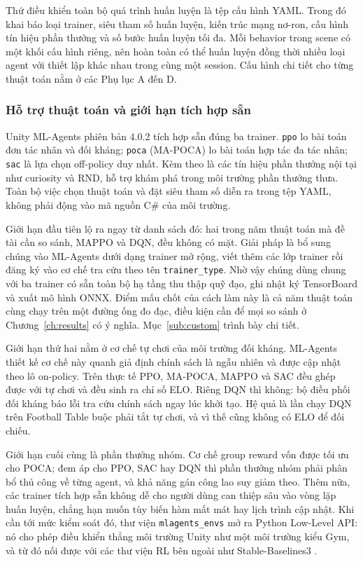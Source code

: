 \indent Thứ điều khiển toàn bộ quá trình huấn luyện là tệp cấu hình YAML. Trong đó khai
báo loại trainer, siêu tham số huấn luyện, kiến trúc mạng nơ-ron, cấu hình
tín hiệu phần thưởng và số bước huấn luyện tối đa. Mỗi behavior trong scene có một khối cấu hình riêng, nên hoàn toàn
có thể huấn luyện đồng thời nhiều loại agent với thiết lập khác nhau trong cùng một
session. Cấu hình chi tiết cho từng thuật toán nằm ở các Phụ lục A đến D.

\subsubsection{Hỗ trợ thuật toán và giới hạn tích hợp sẵn}
\label{sub:mllimits}
\indent Unity ML-Agents phiên bản 4.0.2 tích hợp sẵn đúng ba trainer. \texttt{ppo} lo bài
toán đơn tác nhân và đối kháng; \texttt{poca} (MA-POCA) lo bài toán hợp tác đa tác nhân;
\texttt{sac} là lựa chọn off-policy duy nhất. Kèm theo là các tín hiệu phần thưởng nội tại
như curiosity và RND, hỗ trợ khám phá trong môi trường phần thưởng thưa. Toàn bộ việc chọn
thuật toán và đặt siêu tham số diễn ra trong tệp YAML, không phải động vào mã nguồn C\#
của môi trường.

\indent Giới hạn đầu tiên lộ ra ngay từ danh sách đó: hai trong năm thuật toán mà đề tài
cần so sánh, MAPPO và DQN, đều không có mặt. Giải pháp là bổ sung chúng vào ML-Agents dưới
dạng trainer mở rộng, viết thêm các lớp trainer rồi đăng ký vào cơ chế tra cứu theo tên
\texttt{trainer\_type}. Nhờ vậy chúng dùng chung với ba trainer có sẵn toàn bộ hạ tầng thu
thập quỹ đạo, ghi nhật ký TensorBoard và xuất mô hình ONNX. Điểm mấu chốt của cách làm này
là cả năm thuật toán cùng chạy trên một đường ống đo đạc, điều kiện cần để mọi so sánh ở
Chương~\ref{ch:results} có ý nghĩa. Mục~\ref{sub:custom} trình bày chi tiết.

\indent Giới hạn thứ hai nằm ở cơ chế tự chơi của môi trường đối kháng. ML-Agents thiết kế
cơ chế này quanh giả định chính sách là ngẫu nhiên và được cập nhật theo lô on-policy.
Trên thực tế PPO, MA-POCA, MAPPO và SAC đều ghép được với tự chơi và đều sinh ra chỉ số
ELO. Riêng DQN thì không: bộ điều phối đối kháng báo lỗi tra cứu chính sách ngay lúc khởi
tạo. Hệ quả là lần chạy DQN trên Football Table buộc phải tắt tự chơi, và vì thế cũng
không có ELO để đối chiếu.

\indent Giới hạn cuối cùng là phần thưởng nhóm. Cơ chế group reward vốn được tối ưu
cho POCA; đem áp cho PPO, SAC hay DQN thì phần thưởng nhóm phải phân bổ thủ công về từng
agent, và khả năng gán công lao suy giảm theo. Thêm nữa, các trainer tích hợp sẵn không dễ
cho người dùng can thiệp sâu vào vòng lặp huấn luyện, chẳng hạn muốn tùy biến hàm mất mát
hay lịch trình cập nhật. Khi cần tới mức kiểm soát đó, thư viện \texttt{mlagents\_envs}
mở ra Python Low-Level API: nó cho phép điều khiển thẳng môi trường Unity như một môi
trường kiểu Gym, và từ đó nối được với các thư viện RL bên ngoài như Stable-Baselines3
\cite{raffin2021stable}.
